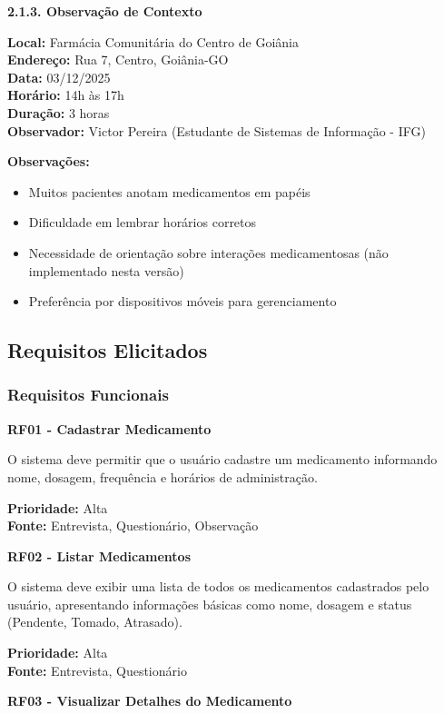 \documentclass[12pt]{article}
\begin{document}
\textbf{2.1.3. Observação de Contexto}

\textbf{Local:} Farmácia Comunitária do Centro de Goiânia \\
\textbf{Endereço:} Rua 7, Centro, Goiânia-GO \\
\textbf{Data:} 03/12/2025 \\
\textbf{Horário:} 14h às 17h \\
\textbf{Duração:} 3 horas \\
\textbf{Observador:} Victor Pereira (Estudante de Sistemas de Informação - IFG)

\textbf{Observações:}
\begin{itemize}
    \item Muitos pacientes anotam medicamentos em papéis
    \item Dificuldade em lembrar horários corretos
    \item Necessidade de orientação sobre interações medicamentosas (não implementado nesta versão)
    \item Preferência por dispositivos móveis para gerenciamento
\end{itemize}

\subsection{Requisitos Elicitados}

\subsubsection{Requisitos Funcionais}

\textbf{RF01 - Cadastrar Medicamento}

O sistema deve permitir que o usuário cadastre um medicamento informando nome, dosagem, frequência e horários de administração.

\textbf{Prioridade:} Alta \\
\textbf{Fonte:} Entrevista, Questionário, Observação

\textbf{RF02 - Listar Medicamentos}

O sistema deve exibir uma lista de todos os medicamentos cadastrados pelo usuário, apresentando informações básicas como nome, dosagem e status (Pendente, Tomado, Atrasado).

\textbf{Prioridade:} Alta \\
\textbf{Fonte:} Entrevista, Questionário

\textbf{RF03 - Visualizar Detalhes do Medicamento}
\end{document}
